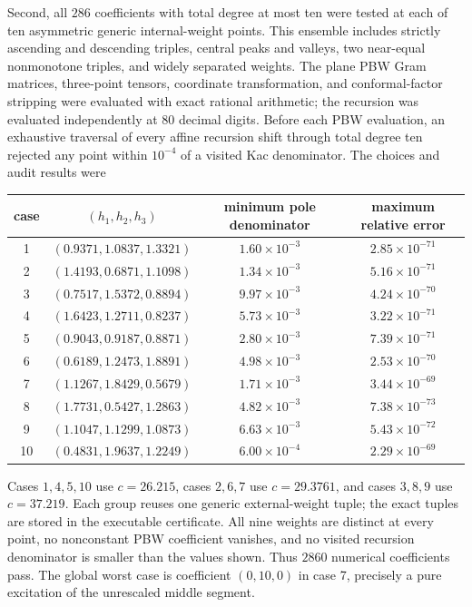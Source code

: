 \documentclass[11pt]{article}
\begin{document}
Second, all $286$ coefficients with total degree at most ten were tested at
each of ten asymmetric generic internal-weight points.  This ensemble
includes strictly ascending and descending triples, central peaks and
valleys, two near-equal nonmonotone triples, and widely separated weights.
The plane PBW Gram matrices,
three-point tensors, coordinate transformation, and conformal-factor
stripping were evaluated with exact rational arithmetic; the recursion was
evaluated independently at $80$ decimal digits.  Before each PBW evaluation,
an exhaustive traversal of every affine recursion shift through total degree
ten rejected any point within $10^{-4}$ of a visited Kac denominator.  The
choices and audit results were
\begin{center}
\scriptsize
\begin{tabular}{c|c|c|c}
case & $(h_1,h_2,h_3)$ & minimum pole denominator & maximum relative error\\
\hline
1 & $(0.9371,1.0837,1.3321)$ & $1.60\times10^{-3}$ & $2.85\times10^{-71}$\\
2 & $(1.4193,0.6871,1.1098)$ & $1.34\times10^{-3}$ & $5.16\times10^{-71}$\\
3 & $(0.7517,1.5372,0.8894)$ & $9.97\times10^{-3}$ & $4.24\times10^{-70}$\\
4 & $(1.6423,1.2711,0.8237)$ & $5.73\times10^{-3}$ & $3.22\times10^{-71}$\\
5 & $(0.9043,0.9187,0.8871)$ & $2.80\times10^{-3}$ & $7.39\times10^{-71}$\\
6 & $(0.6189,1.2473,1.8891)$ & $4.98\times10^{-3}$ & $2.53\times10^{-70}$\\
7 & $(1.1267,1.8429,0.5679)$ & $1.71\times10^{-3}$ & $3.44\times10^{-69}$\\
8 & $(1.7731,0.5427,1.2863)$ & $4.82\times10^{-3}$ & $7.38\times10^{-73}$\\
9 & $(1.1047,1.1299,1.0873)$ & $6.63\times10^{-3}$ & $5.43\times10^{-72}$\\
10 & $(0.4831,1.9637,1.2249)$ & $6.00\times10^{-4}$ & $2.29\times10^{-69}$
\end{tabular}
\end{center}
Cases $1,4,5,10$ use $c=26.215$, cases $2,6,7$ use $c=29.3761$, and
cases $3,8,9$ use $c=37.219$.  Each group reuses one generic external-weight
tuple; the exact tuples are stored in the executable certificate.
All nine weights are distinct at every point, no nonconstant PBW
coefficient vanishes, and no visited recursion denominator is smaller than
the values shown.  Thus $2860$ numerical coefficients pass.  The global
worst case is coefficient $(0,10,0)$ in case 7, precisely a pure excitation
of the unrescaled middle segment.
\end{document}
